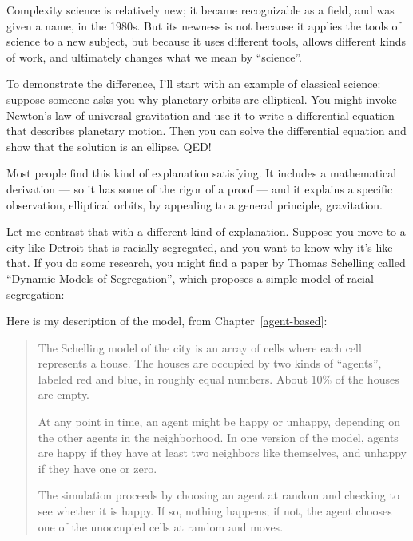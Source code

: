 \documentclass[12pt]{book}
\theoremstyle{exercise}
\begin{document}
Complexity science is relatively new; it became recognizable as a
field, and was given a name, in the 1980s.  But its newness is not because it
applies the tools of science to a new subject, but because it uses
different tools, allows different kinds of work, and ultimately
changes what we mean by ``science''.


To demonstrate the difference, I'll start with an example of classical
science: suppose someone asks you why planetary orbits are
elliptical.  You might invoke Newton's law of universal
gravitation and use it to write a differential equation that describes
planetary motion.  Then you can solve the differential equation and
show that the solution is an ellipse.  QED!


Most people find this kind of explanation satisfying.  It includes a
mathematical derivation --- so it has some of the rigor of a proof --- and
it explains a specific observation, elliptical orbits, by appealing to
a general principle, gravitation.


Let me contrast that with a different kind of explanation.  Suppose
you move to a city like Detroit that is racially segregated, and you
want to know why it's like that.  If you do some research, you might
find a paper by Thomas Schelling called ``Dynamic Models of
Segregation'', which proposes a simple model of racial segregation:


Here is my description of the model, from Chapter~\ref{agent-based}:

\begin{quote}
The Schelling model of the city is an array of cells where each cell
represents a house.  The houses are occupied by two kinds of
``agents'', labeled red and blue, in roughly equal numbers.  About
10\% of the houses are empty.


At any point in time, an agent might be happy or unhappy, depending on
the other agents in the neighborhood.  In one version of the model,
agents are happy if they have at least two neighbors like themselves,
and unhappy if they have one or zero.


The simulation proceeds by choosing an agent at random and checking
to see whether it is happy.  If so, nothing happens; if not,
the agent chooses one of the unoccupied cells at
random and moves.
\end{quote}
\end{document}

